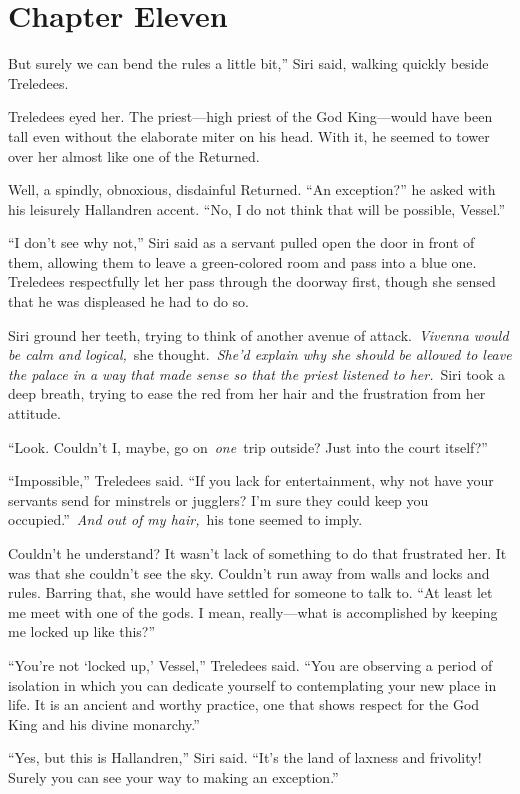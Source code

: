 \section{Chapter Eleven}

But surely we can bend the rules a little bit,” Siri said, walking quickly beside Treledees.

Treledees eyed her. The priest—high priest of the God King—would have been tall even without the elaborate miter on his head. With it, he seemed to tower over her almost like one of the Returned.

Well, a spindly, obnoxious, disdainful Returned. “An exception?” he asked with his leisurely Hallandren accent. “No, I do not think that will be possible, Vessel.”

“I don’t see why not,” Siri said as a servant pulled open the door in front of them, allowing them to leave a green-colored room and pass into a blue one. Treledees respectfully let her pass through the doorway first, though she sensed that he was displeased he had to do so.

Siri ground her teeth, trying to think of another avenue of attack.~\textit{Vivenna would be calm and logical,}~she thought.~\textit{She’d explain why she should be allowed to leave the palace in a way that made sense so that the priest listened to her.}~Siri took a deep breath, trying to ease the red from her hair and the frustration from her attitude.

“Look. Couldn’t I, maybe, go on~\textit{one}~trip outside? Just into the court itself?”

“Impossible,” Treledees said. “If you lack for entertainment, why not have your servants send for minstrels or jugglers? I’m sure they could keep you occupied.”~\textit{And out of my hair,}~his tone seemed to imply.

Couldn’t he understand? It wasn’t lack of something to do that frustrated her. It was that she couldn’t see the sky. Couldn’t run away from walls and locks and rules. Barring that, she would have settled for someone to talk to. “At least let me meet with one of the gods. I mean, really—what is accomplished by keeping me locked up like this?”

“You’re not ‘locked up,’ Vessel,” Treledees said. “You are observing a period of isolation in which you can dedicate yourself to contemplating your new place in life. It is an ancient and worthy practice, one that shows respect for the God King and his divine monarchy.”

“Yes, but this is Hallandren,” Siri said. “It’s the land of laxness and frivolity! Surely you can see your way to making an exception.”

